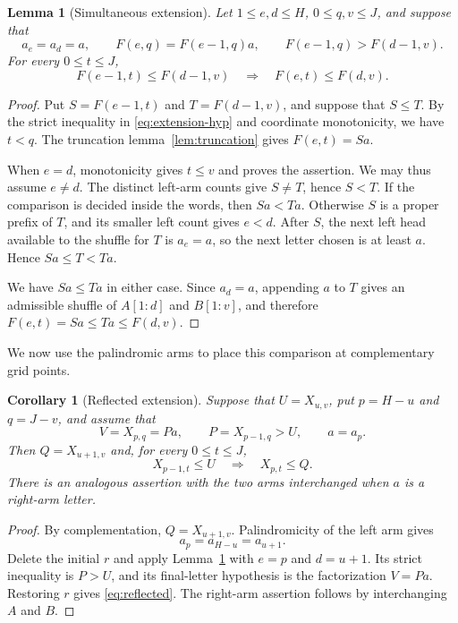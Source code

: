 \documentclass[11pt]{amsart}
\numberwithin{equation}{section}
\newtheorem{lemma}[theorem]{Lemma}
\newtheorem{corollary}[theorem]{Corollary}
\theoremstyle{definition}
\begin{document}
\begin{lemma}[Simultaneous extension]\label{lem:extension}
Let $1\leq e,d\leq H$, $0\leq q,v\leq J$, and suppose that
\begin{equation}\label{eq:extension-hyp}
 a_e=a_d=a,
 \qquad F(e,q)=F(e-1,q)a,
 \qquad F(e-1,q)>F(d-1,v).
\end{equation}
For every $0\leq t\leq J$,
\begin{equation}\label{eq:extension-conclusion}
 F(e-1,t)\leq F(d-1,v)
 \quad\Longrightarrow\quad
 F(e,t)\leq F(d,v).
\end{equation}
\end{lemma}
\begin{proof}
Put $S=F(e-1,t)$ and $T=F(d-1,v)$, and suppose that $S\leq T$. By the strict inequality in \eqref{eq:extension-hyp} and coordinate monotonicity, we have $t<q$. The truncation lemma~\ref{lem:truncation} gives $F(e,t)=Sa$.

When $e=d$, monotonicity gives $t\leq v$ and proves the assertion. We may thus assume $e\ne d$. The distinct left-arm counts give $S\ne T$, hence $S<T$. If the comparison is decided inside the words, then $Sa<Ta$. Otherwise $S$ is a proper prefix of $T$, and its smaller left count gives $e<d$. After $S$, the next left head available to the shuffle for $T$ is $a_e=a$, so the next letter chosen is at least $a$. Hence $Sa\leq T<Ta$.

We have $Sa\leq Ta$ in either case. Since $a_d=a$, appending $a$ to $T$ gives an admissible shuffle of $A[1:d]$ and $B[1:v]$, and therefore $F(e,t)=Sa\leq Ta\leq F(d,v)$.
\end{proof}

We now use the palindromic arms to place this comparison at complementary grid points.

\begin{corollary}[Reflected extension]\label{cor:reflected}
Suppose that $U=X_{u,v}$, put $p=H-u$ and $q=J-v$, and assume that
\[
 V=X_{p,q}=Pa,\qquad P=X_{p-1,q}>U,
 \qquad a=a_p.
\]
Then $Q=X_{u+1,v}$ and, for every $0\leq t\leq J$,
\begin{equation}\label{eq:reflected}
 X_{p-1,t}\leq U\quad\Longrightarrow\quad X_{p,t}\leq Q.
\end{equation}
There is an analogous assertion with the two arms interchanged when $a$ is a right-arm letter.
\end{corollary}
\begin{proof}
By complementation, $Q=X_{u+1,v}$. Palindromicity of the left arm gives
\[
 a_p=a_{H-u}=a_{u+1}.
\]
Delete the initial $r$ and apply Lemma~\ref{lem:extension} with $e=p$ and $d=u+1$. Its strict inequality is $P>U$, and its final-letter hypothesis is the factorization $V=Pa$. Restoring $r$ gives \eqref{eq:reflected}. The right-arm assertion follows by interchanging $A$ and $B$.
\end{proof}
\end{document}
